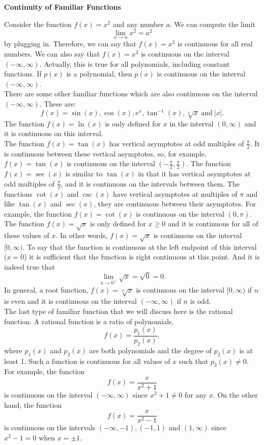 \documentclass{ximera}
\begin{document}
\begin{center}
\textbf{Continuity of Familiar Functions}
\end{center}

Consider the function $f(x) = x^2$ and any number $a$. We can compute the limit 
\[\lim_{x \to a} x^2 = a^2\]
by plugging in. Therefore, we can say that $f(x) = x^2$ is continuous for all real numbers.
We can also say that $f(x) = x^2$ is continuous on the interval $(-\infty, \infty)$.
Actually, this is true for all polynomials, including constant functions.
If $p(x)$ is a polynomial, then $p(x)$ is continuous on the interval $(-\infty, \infty)$.\\
There are some other familiar functions which are also continuous on the interval $(-\infty, \infty)$.
These are: 
\[f(x) = \sin(x), \cos(x), e^x, \tan^{-1}(x), \sqrt[3] x \ \text{and} \ |x|.\]
The function $f(x) = \ln(x)$ is only defined for $x$ in the interval $(0, \infty)$ and it is 
continuous on this interval.\\
The function $f(x) = \tan(x)$ has vertical asymptotes at odd multiples of $\frac{\pi}{2}$. 
It is continuous between these vertical asymptotes, so, for example, $f(x) = \tan(x)$ is continuous on the 
interval $(-\frac{\pi}{2},\frac{\pi}{2})$.
The function $f(x) = \sec(x)$ is similar to $\tan(x)$ in that it has vertical asymptotes at odd 
multiples of $\frac{\pi}{2}$, and it is continuous on the intervals between them.
The functions $\cot(x)$ and $\csc(x)$ have vertical asymptotes at multiples of $\pi$ and like 
$\tan(x)$ and $\sec(x)$, they are continuous between their asymptotes. For example, the function
$f(x) = \cot(x)$ is continuous on the interval $(0, \pi)$.\\



The function $f(x) = \sqrt x$ is only defined for $x \geq 0$ and it is continuous for all of these values of $x$.
In other words, $f(x) = \sqrt x$ is continuous on the interval $[0, \infty)$. 
To say that the function is continuous at the left endpoint of this interval ($x = 0$) it is sufficient 
that the function is right continuous at this point. And it is indeed true that
\[\lim_{x \to 0^+} \sqrt x = \sqrt 0 = 0.\]
In general, a root function, $f(x) = \sqrt[n] x$ is continuous on the interval $[0, \infty)$ if $n$ is even and 
it is continuous on the interval $(-\infty, \infty)$ if $n$ is odd.\\

The last type of familiar function that we will discuss here is the rational function.  
A rational function is a ratio of polynomials, 
\[f(x) = \frac{p_1(x)}{p_2(x)}, \]
where $p_1(x)$ and $p_2(x)$ are both polynomials and the degree of $p_2(x)$ is at least 1.
Such a function is continuous for all values of $x$ such that $p_2(x) \neq 0$.
For example, the function
\[f(x) = \frac{x}{x^2 + 1}\]
is continuous on the interval $(-\infty, \infty)$ since $x^2 + 1 \neq 0$ for any $x$.
On the other hand, the function
\[f(x) = \frac{x}{x^2 - 1}\]
is continuous on the intervals $(-\infty, -1), (-1, 1)$ and $(1, \infty)$ since $ x^2 - 1 = 0$
when $x = \pm 1$.
\end{document}
